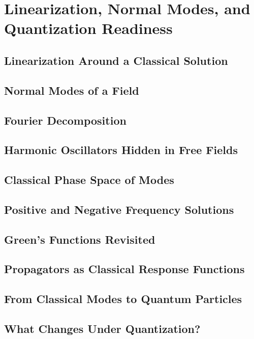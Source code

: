 \chapter{Linearization, Normal Modes, and Quantization Readiness}

\section{Linearization Around a Classical Solution}
\section{Normal Modes of a Field}
\section{Fourier Decomposition}
\section{Harmonic Oscillators Hidden in Free Fields}
\section{Classical Phase Space of Modes}
\section{Positive and Negative Frequency Solutions}
\section{Green's Functions Revisited}
\section{Propagators as Classical Response Functions}
\section{From Classical Modes to Quantum Particles}
\section{What Changes Under Quantization?}
